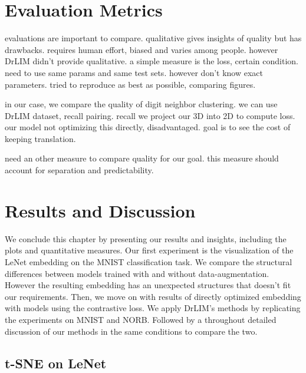 \documentclass[a4paper,12pt]{report}
\begin{document}
\section{Evaluation Metrics}
evaluations are important to compare.
qualitative gives insights of quality but has drawbacks.
requires human effort, biased and varies among people.
however DrLIM didn't provide qualitative.
a simple measure is the loss, certain condition.
need to use same params and same test sets.
however don't know exact parameters.
tried to reproduce as best as possible, comparing figures.

in our case, we compare the quality of digit neighbor clustering.
we can use DrLIM dataset, recall pairing.
recall we project our 3D into 2D to compute loss.
our model not optimizing this directly, disadvantaged.
goal is to see the cost of keeping translation.

need an other measure to compare quality for our goal.
this measure should account for separation and predictability.


\section{Results and Discussion}

We conclude this chapter by presenting our results and insights, including the plots and quantitative measures.
Our first experiment is the visualization of the LeNet embedding on the MNIST classification task.
We compare the structural differences between models trained with and without data-augmentation.
However the resulting embedding has an unexpected structures that doesn't fit our requirements.
Then, we move on with results of directly optimized embedding with models using the contrastive loss.
We apply DrLIM's methods by replicating the experiments on MNIST and NORB.
Followed by a throughout detailed discussion of our methods in the same conditions to compare the two.


\subsection{t-SNE on LeNet}
\end{document}
